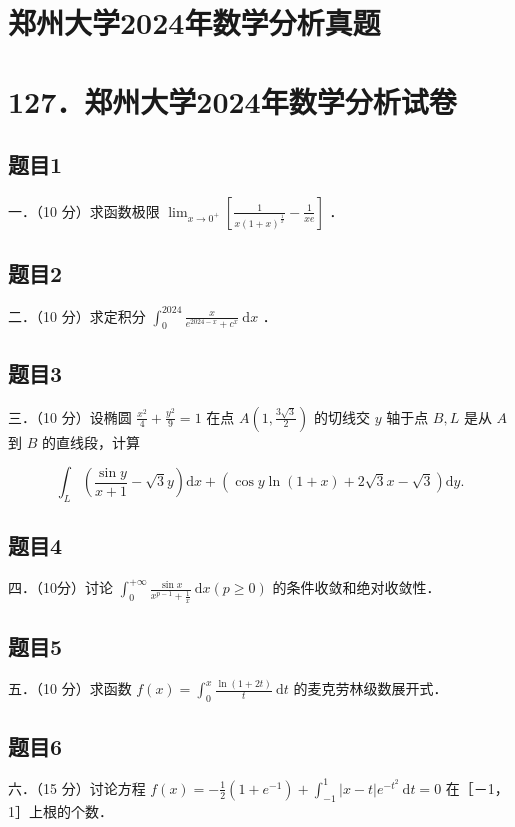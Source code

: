 \documentclass{article}
\begin{document}
\section*{郑州大学2024年数学分析真题}
\section*{127．郑州大学2024年数学分析试卷}

\subsection{题目1}
一．（10 分）求函数极限 \(\lim _{x \rightarrow 0^{+}}\left[\frac{1}{x(1+x)^{\frac{1}{x}}}-\frac{1}{x e}\right]\) ．

\subsection{题目2}
二．（10 分）求定积分 \(\int_{0}^{2024} \frac{x}{e^{2024-x}+c^{x}} \mathrm{~d} x\) ．

\subsection{题目3}
三．（10 分）设椭圆 \(\frac{x^{2}}{4}+\frac{y^{2}}{9}=1\) 在点 \(A\left(1, \frac{3 \sqrt{3}}{2}\right)\) 的切线交 \(y\) 轴于点 \(B, L\) 是从 \(A\) 到 \(B\) 的直线段，计算

\[
\int_{L}\left(\frac{\sin y}{x+1}-\sqrt{3} y\right) \mathrm{d} x+(\cos y \ln (1+x)+2 \sqrt{3} x-\sqrt{3}) \mathrm{d} y .
\]

\subsection{题目4}
四．（10分）讨论 \(\int_{0}^{+\infty} \frac{\sin x}{x^{p-1}+\frac{1}{x}} \mathrm{~d} x(p \geq 0)\) 的条件收敛和绝对收敛性．

\subsection{题目5}
五．（10 分）求函数 \(f(x)=\int_{0}^{x} \frac{\ln (1+2 t)}{t} \mathrm{~d} t\) 的麦克劳林级数展开式．

\subsection{题目6}
六．（15 分）讨论方程 \(f(x)=-\frac{1}{2}\left(1+e^{-1}\right)+\int_{-1}^{1}|x-t| e^{-t^{2}} \mathrm{~d} t=0\) 在［－1，1］上根的个数．
\end{document}
